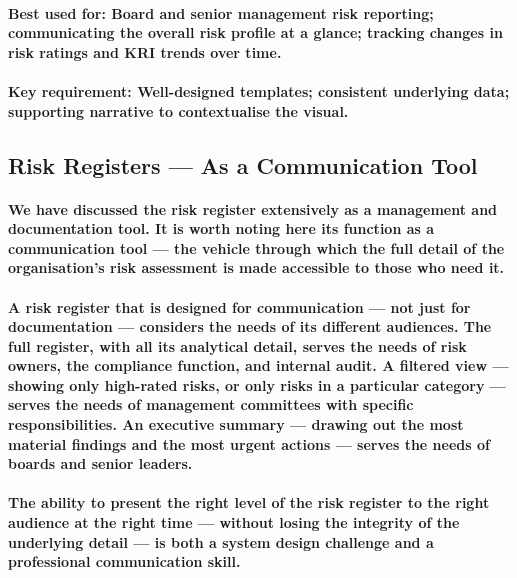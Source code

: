 \paragraph{\textbf{Best used for}: Board and senior management risk reporting; communicating the overall risk profile at a glance; tracking changes in risk ratings and KRI trends over time.}
\paragraph{\textbf{Key requirement}: Well-designed templates; consistent underlying data; supporting narrative to contextualise the visual.}

\subsection{Risk Registers — As a Communication Tool}
\paragraph{We have discussed the risk register extensively as a management and documentation tool. It is worth noting here its function as a \textbf{communication tool} — the vehicle through which the full detail of the organisation's risk assessment is made accessible to those who need it.}
\paragraph{A risk register that is designed for communication — not just for documentation — considers the needs of its different audiences. The full register, with all its analytical detail, serves the needs of risk owners, the compliance function, and internal audit. A filtered view — showing only high-rated risks, or only risks in a particular category — serves the needs of management committees with specific responsibilities. An executive summary — drawing out the most material findings and the most urgent actions — serves the needs of boards and senior leaders.}
\paragraph{The ability to present the right level of the risk register to the right audience at the right time — without losing the integrity of the underlying detail — is both a system design challenge and a professional communication skill.}

